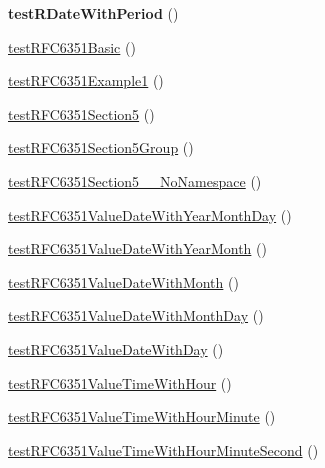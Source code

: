 \begin{DoxyCompactItemize}
{\bfseries test\+R\+Date\+With\+Period} ()
\item 
\mbox{\hyperlink{class_sabre_1_1_v_object_1_1_parser_1_1_xml_test_a778808e4254dafe230314c98e116ca78}{test\+R\+F\+C6351\+Basic}} ()
\item 
\mbox{\hyperlink{class_sabre_1_1_v_object_1_1_parser_1_1_xml_test_a7eb1c5a7e1ebe4e8bf8fc73f54cee9a0}{test\+R\+F\+C6351\+Example1}} ()
\item 
\mbox{\hyperlink{class_sabre_1_1_v_object_1_1_parser_1_1_xml_test_aa6a618e2089e14ca0e9cd4f994f9bf6d}{test\+R\+F\+C6351\+Section5}} ()
\item 
\mbox{\hyperlink{class_sabre_1_1_v_object_1_1_parser_1_1_xml_test_ad89c5e4d6714bf4d8d8b60bddb1db509}{test\+R\+F\+C6351\+Section5\+Group}} ()
\item 
\mbox{\hyperlink{class_sabre_1_1_v_object_1_1_parser_1_1_xml_test_abfe3adb9832bb1c50c41a209fc52325a}{test\+R\+F\+C6351\+Section5\+\_\+\_\+\+No\+Namespace}} ()
\item 
\mbox{\hyperlink{class_sabre_1_1_v_object_1_1_parser_1_1_xml_test_a256aff5b2f7468f9392d986cc911b380}{test\+R\+F\+C6351\+Value\+Date\+With\+Year\+Month\+Day}} ()
\item 
\mbox{\hyperlink{class_sabre_1_1_v_object_1_1_parser_1_1_xml_test_a20f58b767bd9d632e1fb61f6e3766fcb}{test\+R\+F\+C6351\+Value\+Date\+With\+Year\+Month}} ()
\item 
\mbox{\hyperlink{class_sabre_1_1_v_object_1_1_parser_1_1_xml_test_a4d58114d56f4de504f560540d0ce3582}{test\+R\+F\+C6351\+Value\+Date\+With\+Month}} ()
\item 
\mbox{\hyperlink{class_sabre_1_1_v_object_1_1_parser_1_1_xml_test_a5c27189ac906ec08c935ed5a17cbbd7c}{test\+R\+F\+C6351\+Value\+Date\+With\+Month\+Day}} ()
\item 
\mbox{\hyperlink{class_sabre_1_1_v_object_1_1_parser_1_1_xml_test_a96d8ba37381c195c66136e68ba72d6c5}{test\+R\+F\+C6351\+Value\+Date\+With\+Day}} ()
\item 
\mbox{\hyperlink{class_sabre_1_1_v_object_1_1_parser_1_1_xml_test_ad488016f3b66a37a0af4b292bbefdb02}{test\+R\+F\+C6351\+Value\+Time\+With\+Hour}} ()
\item 
\mbox{\hyperlink{class_sabre_1_1_v_object_1_1_parser_1_1_xml_test_ab5d41b117d9866031ed388d4b4ddbf0f}{test\+R\+F\+C6351\+Value\+Time\+With\+Hour\+Minute}} ()
\item 
\mbox{\hyperlink{class_sabre_1_1_v_object_1_1_parser_1_1_xml_test_aa16d0e8d27c3a226fb0d92b50085b586}{test\+R\+F\+C6351\+Value\+Time\+With\+Hour\+Minute\+Second}} ()
\item 

\end{DoxyCompactItemize}
